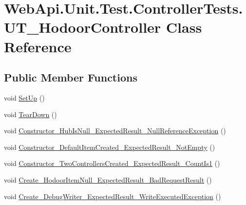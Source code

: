 \hypertarget{class_web_api_1_1_unit_1_1_test_1_1_controller_tests_1_1_u_t___hodoor_controller}{}\section{Web\+Api.\+Unit.\+Test.\+Controller\+Tests.\+U\+T\+\_\+\+Hodoor\+Controller Class Reference}
\label{class_web_api_1_1_unit_1_1_test_1_1_controller_tests_1_1_u_t___hodoor_controller}
\subsection*{Public Member Functions}
\begin{DoxyCompactItemize}
\item 
void \mbox{\hyperlink{class_web_api_1_1_unit_1_1_test_1_1_controller_tests_1_1_u_t___hodoor_controller_a97bd4784d4ffb1434a6a2ed0af46b3ee}{Set\+Up}} ()
\item 
void \mbox{\hyperlink{class_web_api_1_1_unit_1_1_test_1_1_controller_tests_1_1_u_t___hodoor_controller_a3c1d39b9eb2826f2d1aa99f1d434e5c4}{Tear\+Down}} ()
\item 
void \mbox{\hyperlink{class_web_api_1_1_unit_1_1_test_1_1_controller_tests_1_1_u_t___hodoor_controller_a08f06439b7fc5ac80ded30eb5ed4a871}{Constructor\+\_\+\+Hub\+Is\+Null\+\_\+\+Expected\+Result\+\_\+\+Null\+Reference\+Exception}} ()
\item 
void \mbox{\hyperlink{class_web_api_1_1_unit_1_1_test_1_1_controller_tests_1_1_u_t___hodoor_controller_a530aff67553284a581aa93fc11f7283a}{Constructor\+\_\+\+Default\+Item\+Created\+\_\+\+Expected\+Result\+\_\+\+Not\+Empty}} ()
\item 
void \mbox{\hyperlink{class_web_api_1_1_unit_1_1_test_1_1_controller_tests_1_1_u_t___hodoor_controller_a5fc5428afc1bda01618700546294ce55}{Constructor\+\_\+\+Two\+Controllers\+Created\+\_\+\+Expected\+Result\+\_\+\+Count\+Is1}} ()
\item 
void \mbox{\hyperlink{class_web_api_1_1_unit_1_1_test_1_1_controller_tests_1_1_u_t___hodoor_controller_ad5c107aa5294b3b4de3fbdbc5b24500f}{Create\+\_\+\+Hodoor\+Item\+Null\+\_\+\+Expected\+Result\+\_\+\+Bad\+Request\+Result}} ()
\item 
void \mbox{\hyperlink{class_web_api_1_1_unit_1_1_test_1_1_controller_tests_1_1_u_t___hodoor_controller_a9b609452fce5ea6908167a511a925163}{Create\+\_\+\+Debug\+Writer\+\_\+\+Expected\+Result\+\_\+\+Write\+Executed\+Exception}} ()

\end{DoxyCompactItemize}
